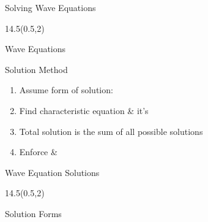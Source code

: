 
\begin{frame}{Solving Wave Equations}
	\begin{textblock}{14.5}(0.5,2)
	\begin{myblock}[0.9]{Wave Equations}
			\vspace{-8pt}
		\end{myblock}
		
		\begin{myblock}[0.9]{Solution Method}
			\begin{enumerate}[<+->]
				\item Assume form of solution: 
				\item Find characteristic equation \& it's 
				\item Total solution is the sum of all possible solutions
				\item Enforce  \&  
			\end{enumerate}
		\end{myblock}
	\end{textblock}
\end{frame}


\begin{frame}{Wave Equation Solutions}
	\begin{textblock}{14.5}(0.5,2)
	\begin{myblock}[0.9]{Solution Forms}
			\vspace{-8pt}
		\end{myblock}
		

	\end{textblock}
\end{frame}


